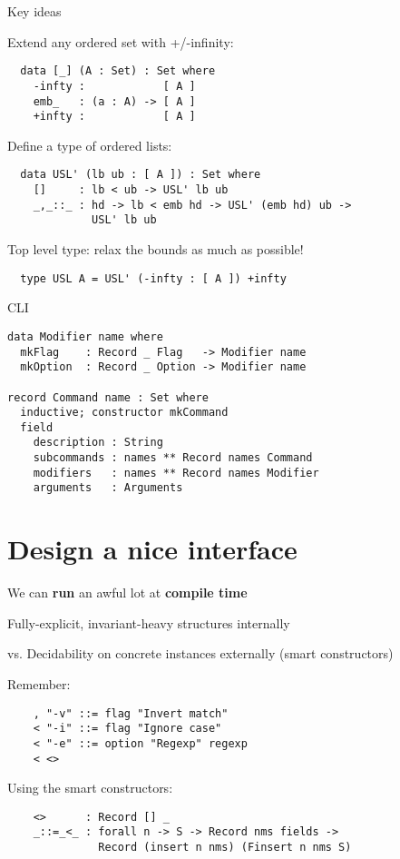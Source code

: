 \documentclass[dvipsnames]{beamer}
\begin{document}
\begin{frame}[fragile]{Key ideas}

  Extend any ordered set with +/-infinity:
  \begin{verbatim}
  data [_] (A : Set) : Set where
    -infty :            [ A ]
    emb_   : (a : A) -> [ A ]
    +infty :            [ A ]
  \end{verbatim}

  Define a type of ordered lists:
  \begin{verbatim}
  data USL' (lb ub : [ A ]) : Set where
    []     : lb < ub -> USL' lb ub
    _,_::_ : hd -> lb < emb hd -> USL' (emb hd) ub ->
             USL' lb ub
  \end{verbatim}

  Top level type: relax the bounds as much as possible!
  \begin{verbatim}
  type USL A = USL' (-infty : [ A ]) +infty
  \end{verbatim}
\end{frame}

\begin{frame}[fragile]{CLI}

\begin{verbatim}
data Modifier name where
  mkFlag    : Record _ Flag   -> Modifier name
  mkOption  : Record _ Option -> Modifier name

record Command name : Set where
  inductive; constructor mkCommand
  field
    description : String
    subcommands : names ** Record names Command
    modifiers   : names ** Record names Modifier
    arguments   : Arguments
\end{verbatim}
\end{frame}

\section{Design a nice interface}
\begin{frame}[fragile]{We can \textbf{run} an awful lot at \textbf{compile time}}

  Fully-explicit, invariant-heavy structures internally

  vs. Decidability on concrete instances externally (smart constructors)

  Remember:
  \begin{verbatim}
    , "-v" ::= flag "Invert match"
    < "-i" ::= flag "Ignore case"
    < "-e" ::= option "Regexp" regexp
    < <>
  \end{verbatim}

  Using the smart constructors:
  \begin{verbatim}
    <>      : Record [] _
    _::=_<_ : forall n -> S -> Record nms fields ->
              Record (insert n nms) (Finsert n nms S)
  \end{verbatim}
  
\end{frame}
\end{document}
